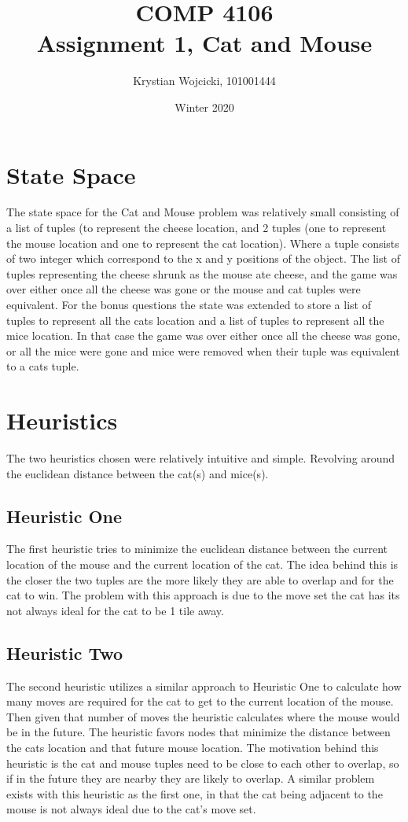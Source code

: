 \documentclass{article}
\title{COMP 4106\\
	\large{Assignment 1, Cat and Mouse}}
\author{Krystian Wojcicki, 101001444}
\date{Winter 2020}
\begin{document}
\maketitle

\section{State Space}
The state space for the Cat and Mouse problem was relatively small consisting of a list of tuples (to represent the cheese location, and 2 tuples (one to represent the mouse location and one to represent the cat location). Where a tuple consists of two integer which correspond to the x and y positions of the object. The list of tuples representing the cheese shrunk as the mouse ate cheese, and the game was over either once all the cheese was gone or the mouse and cat tuples were equivalent. For the bonus questions the state was extended to store a list of tuples to represent all the cats location and a list of tuples to represent all the mice location. In that case the game was over either once all the cheese was gone, or all the mice were gone and mice were removed when their tuple was equivalent to a cats tuple.

\section{Heuristics}

The two heuristics chosen were relatively intuitive and simple. Revolving around the euclidean distance between the cat(s) and mice(s).

\subsection{Heuristic One}
The first heuristic tries to minimize the euclidean distance between the current location of the mouse and the current location of the cat. The idea behind this is the closer the two tuples are the more likely they are able to overlap and for the cat to win. The problem with this approach is due to the move set the cat has its not always ideal for the cat to be 1 tile away.

\subsection{Heuristic Two}
The second heuristic utilizes a similar approach to Heuristic One to calculate how many moves are required for the cat to get to the current location of the mouse. Then given that number of moves the heuristic calculates where the mouse would be in the future. The heuristic favors nodes that minimize the distance between the cats location and that future mouse location. The motivation behind this heuristic is the cat and mouse tuples need to be close to each other to overlap, so if in the future they are nearby they are likely to overlap. A similar problem exists with this heuristic as the first one, in that the cat being adjacent to the mouse is not always ideal due to the cat's move set.
\end{document}
